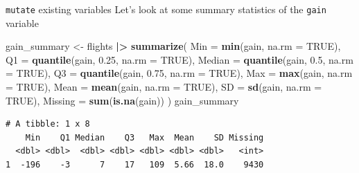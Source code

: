 \documentclass[
  ignorenonframetext,
]{beamer}
\newenvironment{Shaded}{\begin{snugshade}}{\end{snugshade}}
\newcommand{\AttributeTok}[1]{\textcolor[rgb]{0.13,0.29,0.53}{#1}}
\newcommand{\ConstantTok}[1]{\textcolor[rgb]{0.56,0.35,0.01}{#1}}
\newcommand{\FloatTok}[1]{\textcolor[rgb]{0.00,0.00,0.81}{#1}}
\newcommand{\FunctionTok}[1]{\textcolor[rgb]{0.13,0.29,0.53}{\textbf{#1}}}
\newcommand{\NormalTok}[1]{#1}
\newcommand{\OtherTok}[1]{\textcolor[rgb]{0.56,0.35,0.01}{#1}}
\newcommand{\SpecialCharTok}[1]{\textcolor[rgb]{0.81,0.36,0.00}{\textbf{#1}}}
\begin{document}
\begin{frame}[fragile]{\texttt{mutate} existing variables}
\label{mutate-existing-variables-6}
Let's look at some summary statistics of the \texttt{gain} variable

\small

\begin{Shaded}
\begin{Highlighting}[]
\NormalTok{gain\_summary }\OtherTok{\textless{}{-}}\NormalTok{ flights }\SpecialCharTok{|\textgreater{}} 
  \FunctionTok{summarize}\NormalTok{(}
    \AttributeTok{Min =} \FunctionTok{min}\NormalTok{(gain, }\AttributeTok{na.rm =} \ConstantTok{TRUE}\NormalTok{),}
    \AttributeTok{Q1 =} \FunctionTok{quantile}\NormalTok{(gain, }\FloatTok{0.25}\NormalTok{, }\AttributeTok{na.rm =} \ConstantTok{TRUE}\NormalTok{),}
    \AttributeTok{Median =} \FunctionTok{quantile}\NormalTok{(gain, }\FloatTok{0.5}\NormalTok{, }\AttributeTok{na.rm =} \ConstantTok{TRUE}\NormalTok{),}
    \AttributeTok{Q3 =} \FunctionTok{quantile}\NormalTok{(gain, }\FloatTok{0.75}\NormalTok{, }\AttributeTok{na.rm =} \ConstantTok{TRUE}\NormalTok{),}
    \AttributeTok{Max =} \FunctionTok{max}\NormalTok{(gain, }\AttributeTok{na.rm =} \ConstantTok{TRUE}\NormalTok{),}
    \AttributeTok{Mean =} \FunctionTok{mean}\NormalTok{(gain, }\AttributeTok{na.rm =} \ConstantTok{TRUE}\NormalTok{),}
    \AttributeTok{SD =} \FunctionTok{sd}\NormalTok{(gain, }\AttributeTok{na.rm =} \ConstantTok{TRUE}\NormalTok{),}
    \AttributeTok{Missing =} \FunctionTok{sum}\NormalTok{(}\FunctionTok{is.na}\NormalTok{(gain))}
\NormalTok{  )}
\NormalTok{gain\_summary}
\end{Highlighting}
\end{Shaded}

\begin{verbatim}
# A tibble: 1 x 8
    Min    Q1 Median    Q3   Max  Mean    SD Missing
  <dbl> <dbl>  <dbl> <dbl> <dbl> <dbl> <dbl>   <int>
1  -196    -3      7    17   109  5.66  18.0    9430
\end{verbatim}

\normalsize
\end{frame}
\end{document}
